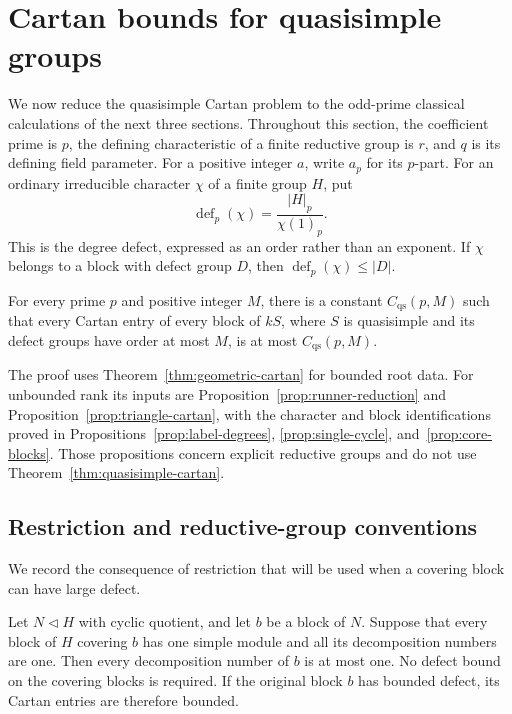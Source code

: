 \section{Cartan bounds for quasisimple groups}\label{sec:families}

We now reduce the quasisimple Cartan problem to the odd-prime classical
calculations of the next three sections.  Throughout this section, the
coefficient prime is \(p\), the defining characteristic of a finite
reductive group is \(r\), and \(q\) is its defining field parameter.
For a positive integer \(a\), write \(a_p\) for its \(p\)-part.  For an
ordinary irreducible character \(\chi\) of a finite group \(H\), put
\[
 \operatorname{def}_p(\chi)=\frac{|H|_p}{\chi(1)_p}.
\]
This is the degree defect, expressed as an order rather than an exponent.
If \(\chi\) belongs to a block with defect group \(D\), then
\(\operatorname{def}_p(\chi)\leq |D|\).

\begin{theorem}\label{thm:quasisimple-cartan}
For every prime \(p\) and positive integer \(M\), there is a constant
\(C_{\mathrm{qs}}(p,M)\) such that every Cartan entry of every block of
\(kS\), where \(S\) is quasisimple and its defect groups have order at
most \(M\), is at most \(C_{\mathrm{qs}}(p,M)\).
\end{theorem}

The proof uses Theorem~\ref{thm:geometric-cartan} for bounded root
data.  For unbounded rank its inputs are Proposition~\ref{prop:runner-reduction}
and Proposition~\ref{prop:triangle-cartan}, with the character and block
identifications proved in Propositions~\ref{prop:label-degrees},
\ref{prop:single-cycle}, and~\ref{prop:core-blocks}.
Those propositions concern explicit reductive groups and do not use
Theorem~\ref{thm:quasisimple-cartan}.

\subsection{Restriction and reductive-group conventions}

We record the consequence of restriction that will be used when a
covering block can have large defect.

\begin{corollary}\label{fam:restriction}
Let \(N\lhd H\) with cyclic quotient, and let \(b\) be a block of
\(N\).  Suppose that every block of \(H\) covering \(b\) has one
simple module and all its decomposition numbers are one.
Then every decomposition number of \(b\) is at most one.
No defect bound on the covering blocks is required.  If the
original block \(b\) has bounded defect, its Cartan entries are
therefore bounded.
\end{corollary}

